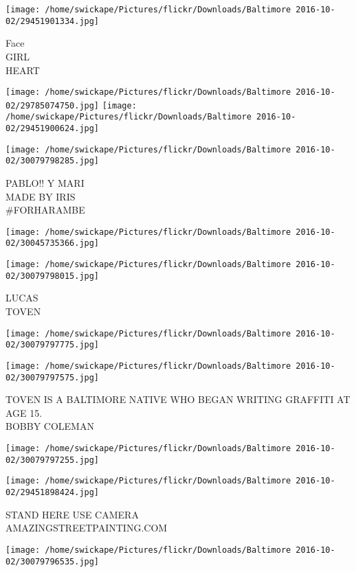 \documentclass[10pt,letterpaper]{article}
\begin{document}
\vspace{0.25in}
\texttt{[image: /home/swickape/Pictures/flickr/Downloads/Baltimore 2016-10-02/29451901334.jpg]}

Face\\
GIRL\\
HEART
\pagebreak

\texttt{[image: /home/swickape/Pictures/flickr/Downloads/Baltimore 2016-10-02/29785074750.jpg]}
\texttt{[image: /home/swickape/Pictures/flickr/Downloads/Baltimore 2016-10-02/29451900624.jpg]}

\vspace{0.25in}
\texttt{[image: /home/swickape/Pictures/flickr/Downloads/Baltimore 2016-10-02/30079798285.jpg]}

PABLO!! Y MARI\\
MADE BY IRIS\\
\#FORHARAMBE
\pagebreak

\texttt{[image: /home/swickape/Pictures/flickr/Downloads/Baltimore 2016-10-02/30045735366.jpg]}

\vspace{0.25in}
\texttt{[image: /home/swickape/Pictures/flickr/Downloads/Baltimore 2016-10-02/30079798015.jpg]}

LUCAS\\
TOVEN
\pagebreak

\texttt{[image: /home/swickape/Pictures/flickr/Downloads/Baltimore 2016-10-02/30079797775.jpg]}

\vspace{0.25in}
\texttt{[image: /home/swickape/Pictures/flickr/Downloads/Baltimore 2016-10-02/30079797575.jpg]}

TOVEN IS A BALTIMORE NATIVE WHO BEGAN WRITING GRAFFITI AT AGE 15.\\
BOBBY COLEMAN
\pagebreak

\texttt{[image: /home/swickape/Pictures/flickr/Downloads/Baltimore 2016-10-02/30079797255.jpg]}

\vspace{0.25in}
\texttt{[image: /home/swickape/Pictures/flickr/Downloads/Baltimore 2016-10-02/29451898424.jpg]}

STAND HERE USE CAMERA\\
AMAZINGSTREETPAINTING.COM
\pagebreak

\texttt{[image: /home/swickape/Pictures/flickr/Downloads/Baltimore 2016-10-02/30079796535.jpg]}
\end{document}
